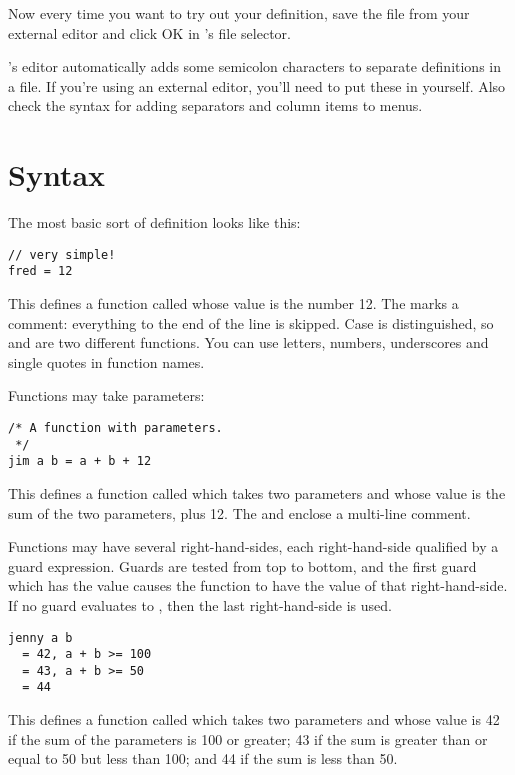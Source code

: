 Now every time you want to try out your definition, save the file from your
external editor and click OK in \nip{}'s file selector. 

\nip{}'s editor automatically adds some semicolon characters to separate
definitions in a file. If you're using an external editor, you'll need to put
these in yourself. Also check the syntax for adding separators and column
items to menus.

\section{Syntax}

The most basic sort of definition looks like this:

\begin{verbatim}
// very simple!
fred = 12
\end{verbatim}

\noindent
This defines a function called  whose value is the number 12. The
\ct{//} marks a comment: everything to the end of the line is skipped.
Case is distinguished, so  and  are two different functions.
You can use letters, numbers, underscores and single quotes in function names.

Functions may take parameters:

\begin{verbatim}
/* A function with parameters.
 */
jim a b = a + b + 12
\end{verbatim}

\noindent
This defines a function called  which takes two parameters and whose
value is the sum of the two parameters, plus 12. The \ct{/*} and \ct{*/}
enclose a multi-line comment.

Functions may have several right-hand-sides, each right-hand-side qualified by
a guard expression. Guards are tested from top to bottom, and the first guard
which has the value  causes the function to have the value of that
right-hand-side. If no guard evaluates to , then the last
right-hand-side is used.

\begin{verbatim}
jenny a b
  = 42, a + b >= 100
  = 43, a + b >= 50
  = 44
\end{verbatim}

\noindent
This defines a function called  which takes two parameters and whose
value is 42 if the sum of the parameters is 100 or greater; 43 if the sum is
greater than or equal to 50 but less than 100; and 44 if the sum is less than
50.

